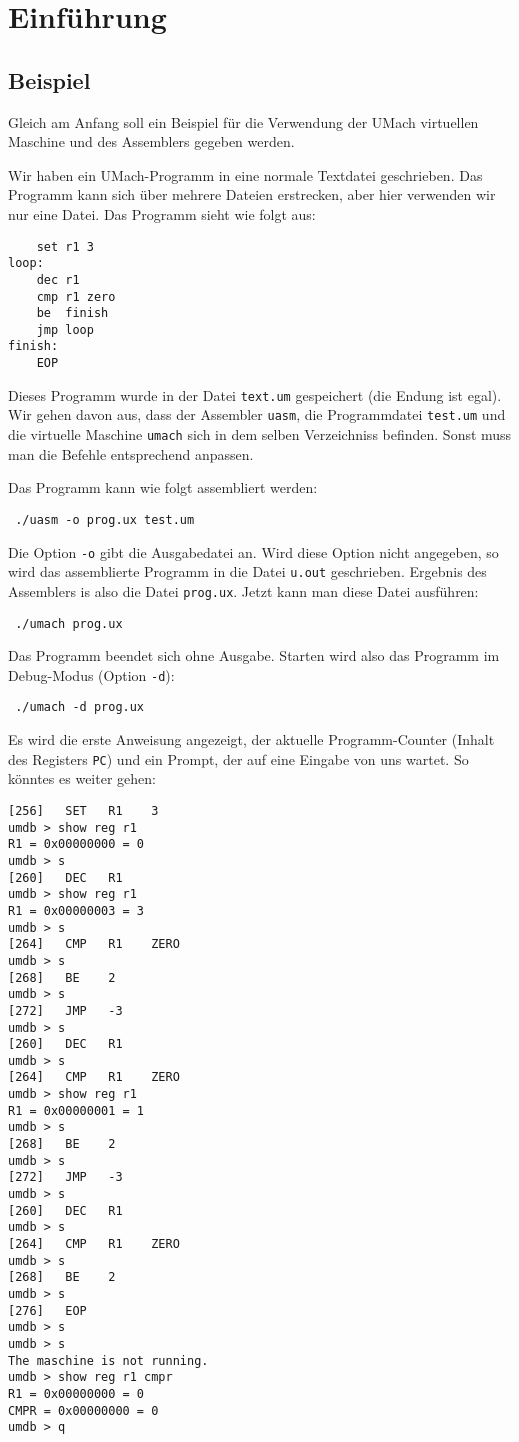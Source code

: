 \chapter{Einführung}

\section{Beispiel}
Gleich am Anfang soll ein Beispiel für die Verwendung der UMach
virtuellen Maschine und des Assemblers gegeben werden.

Wir haben ein UMach-Programm in eine normale Textdatei geschrieben. Das Programm
kann sich über mehrere Dateien erstrecken, aber hier verwenden wir nur eine
Datei. Das Programm sieht wie folgt aus:

\begin{lstlisting}
    set r1 3
loop:
    dec r1
    cmp r1 zero
    be  finish
    jmp loop
finish: 
    EOP
\end{lstlisting}

Dieses Programm wurde in der Datei \texttt{text.um} gespeichert (die Endung ist
egal). Wir gehen davon aus, dass der Assembler \texttt{uasm}, die Programmdatei
\texttt{test.um} und die virtuelle Maschine \texttt{umach} sich in dem selben
Verzeichniss befinden. Sonst muss man die Befehle entsprechend anpassen.

Das Programm kann wie folgt assembliert werden:
\begin{lstlisting}
 ./uasm -o prog.ux test.um
\end{lstlisting}
Die Option \texttt{-o} gibt die Ausgabedatei an. Wird diese Option nicht
angegeben, so wird das assemblierte Programm in die Datei \texttt{u.out}
geschrieben. Ergebnis des Assemblers is also die Datei \texttt{prog.ux}. Jetzt
kann man diese Datei \glqq ausführen\grqq:
\begin{lstlisting}
 ./umach prog.ux
\end{lstlisting}
Das Programm beendet sich ohne Ausgabe. Starten wird also das Programm im
Debug-Modus (Option \texttt{-d}):
\begin{lstlisting}
 ./umach -d prog.ux
\end{lstlisting}
Es wird die erste Anweisung angezeigt, der aktuelle Programm-Counter (Inhalt
des Registers \texttt{PC}) und ein Prompt, der auf eine Eingabe von uns wartet.
So könntes es weiter gehen:
\begin{lstlisting}
[256]   SET   R1    3
umdb > show reg r1
R1 = 0x00000000 = 0
umdb > s
[260]   DEC   R1
umdb > show reg r1
R1 = 0x00000003 = 3
umdb > s
[264]   CMP   R1    ZERO  
umdb > s
[268]   BE    2
umdb > s
[272]   JMP   -3
umdb > s
[260]   DEC   R1
umdb > s
[264]   CMP   R1    ZERO  
umdb > show reg r1
R1 = 0x00000001 = 1
umdb > s
[268]   BE    2
umdb > s
[272]   JMP   -3
umdb > s
[260]   DEC   R1
umdb > s
[264]   CMP   R1    ZERO  
umdb > s
[268]   BE    2
umdb > s
[276]   EOP   
umdb > s
umdb > s
The maschine is not running.
umdb > show reg r1 cmpr
R1 = 0x00000000 = 0
CMPR = 0x00000000 = 0
umdb > q
\end{lstlisting}
